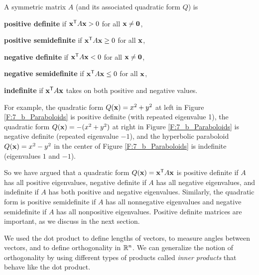 \begin{definition} \label{def:7_4_definite} A symmetric matrix $A$ (and its associated quadratic form $Q$) is
\ba
\item \textbf{positive definite} if $\mathbf{x}^{\mathsf{T}}A\mathbf{x} > 0$ for all $\mathbf{x} \neq \mathbf{0}$,
\item \textbf{positive semidefinite} if $\mathbf{x}^{\mathsf{T}}A\mathbf{x} \geq 0$ for all $\mathbf{x}$,
\item \textbf{negative definite} if $\mathbf{x}^{\mathsf{T}}A\mathbf{x} < 0$ for all $\mathbf{x} \neq \mathbf{0}$,
\item \textbf{negative semidefinite} if $\mathbf{x}^{\mathsf{T}}A\mathbf{x} \leq 0$ for all $\mathbf{x}$,
\item \textbf{indefinite} if $\mathbf{x}^{\mathsf{T}}A\mathbf{x}$ takes on both positive and negative values.
\ea
\end{definition}

For example, the quadratic form $Q(\mathbf{x}) = x^2+y^2$ at left in Figure \ref{F:7_b_Paraboloids} is positive definite (with repeated eigenvalue 1), the quadratic form $Q(\mathbf{x}) = -(x^2+y^2)$ at right in  Figure \ref{F:7_b_Paraboloids} is negative definite (repeated eigenvalue $-1$), and the hyperbolic paraboloid $Q(\mathbf{x}) = x^2-y^2$ in the center of Figure \ref{F:7_b_Paraboloids} is indefinite (eigenvalues $1$ and $-1$). 

So we have argued that a quadratic form $Q(\mathbf{x}) = \mathbf{x}^{\mathsf{T}} A \mathbf{x}$ is positive definite if $A$ has all positive eigenvalues, negative definite if $A$ has all negative eigenvalues, and indefinite if $A$ has both positive and negative eigenvalues. Similarly, the quadratic form is positive semidefinite if $A$ has all nonnegative eigenvalues and negative semidefinite if $A$ has all nonpositive eigenvalues. Positive definite matrices are important, as we discuss in the next section.


We used the dot product to define lengths of vectors, to measure angles between vectors, and to define orthogonality in $\mathbb{R}^n$. We can generalize the notion of orthogonality by using different types of products called \emph{inner products} that behave like the dot product. 

